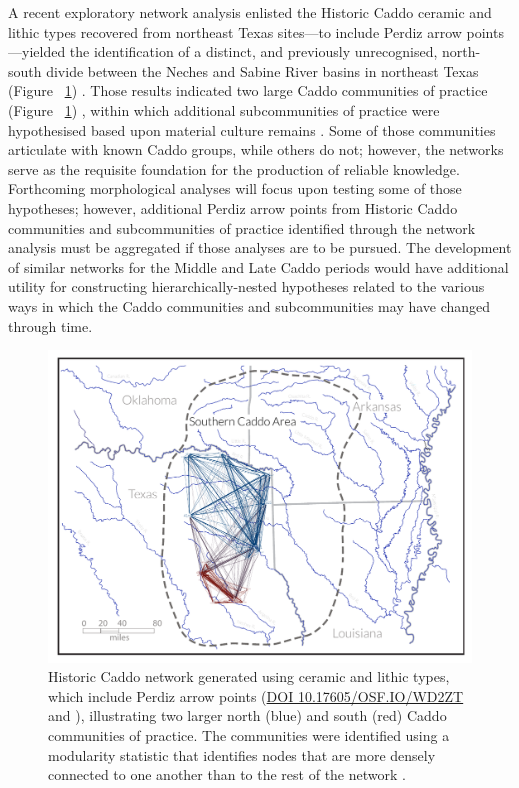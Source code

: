 \documentclass[review]{elsarticle}
\begin{document}
A recent exploratory network analysis enlisted the Historic Caddo ceramic and lithic types recovered from northeast Texas sites---to include Perdiz arrow points---yielded the identification of a distinct, and previously unrecognised, north-south divide between the Neches and Sabine River basins in northeast Texas (Figure ~\ref{fig:fig.net}) \citep{RN8031}. Those results indicated two large Caddo communities of practice (Figure ~\ref{fig:fig.net}) \citep[Figure 16.4]{RN8031}, within which additional subcommunities of practice were hypothesised based upon material culture remains \citep[Figures 16.5 and 16.6]{RN8031}. Some of those communities articulate with known Caddo groups, while others do not; however, the networks serve as the requisite foundation for the production of reliable knowledge. Forthcoming morphological analyses will focus upon testing some of those hypotheses; however, additional Perdiz arrow points from Historic Caddo communities and subcommunities of practice identified through the network analysis must be aggregated if those analyses are to be pursued. The development of similar networks for the Middle and Late Caddo periods would have additional utility for constructing hierarchically-nested hypotheses related to the various ways in which the Caddo communities and subcommunities may have changed through time.

\begin{figure}[!]\centering
\includegraphics[width=\linewidth]{fig.net.pdf}
\caption{Historic Caddo network generated using ceramic and lithic types, which include Perdiz arrow points (\href{https://osf.io/wd2zt/}{DOI 10.17605/OSF.IO/WD2ZT} and \citealt{RN8031}), illustrating two larger north (blue) and south (red) Caddo communities of practice. The communities were identified using a modularity statistic that identifies nodes that are more densely connected to one another than to the rest of the network \citep{RN8051,RN8024}.}
\label{fig:fig.net}
\end{figure}
\end{document}
